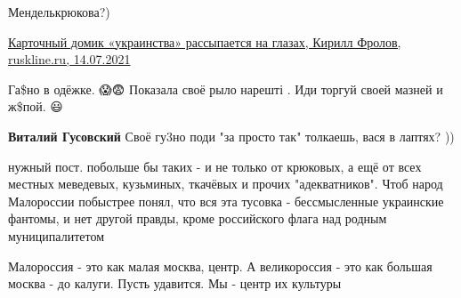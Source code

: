 \begin{itemize}
Менделькрюкова?)

 

\href{https://ruskline.ru/news_rl/2021/07/14/kartochnyi_domik_ukrainstva_rassypaetsya_na_glazah}{%
Карточный домик «украинства» рассыпается на глазах, Кирилл Фролов, ruskline.ru, 14.07.2021%
}


 

\obeycr
Га\$но в одёжке. 😱😨
Показала своё рыло нарешті .
Иди торгуй своей мазней и
ж\$пой.
😃
\restorecr

\begin{itemize}
 
\textbf{Виталий Гусовский} Своё гу3но поди "за просто так" толкаешь, вася в лаптях? ))
\end{itemize}

 

нужный пост. побольше бы таких - и не только от крюковых, а ещё от всех местных
меведевых, кузьминых, ткачёвых и прочих "адекватников". Чтоб народ Малороссии
побыстрее понял, что вся эта тусовка - бессмысленные украинские фантомы, и нет
другой правды, кроме российского флага над родным муниципалитетом


Малороссия - это как малая москва, центр. А великороссия - это как большая
москва - до калуги. Пусть удавится. Мы - центр их культуры

\begin{itemize}
 

\end{itemize}
\end{itemize}
